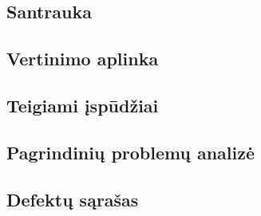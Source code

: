 \subsection{Santrauka}


\newpage
\subsection{Vertinimo aplinka}


\newpage
\subsection{Teigiami įspūdžiai}


\newpage
\subsection{Pagrindinių problemų analizė}


\newpage
\subsection{Defektų sąrašas}



